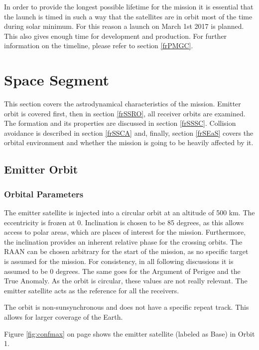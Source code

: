 In order to provide the longest possible lifetime for the mission it is essential that the launch is timed in such a way that the satellites are in orbit most of the time during solar minimum. For this reason a launch on March 1st 2017 is planned. This also gives enough time for development and production. For further information on the timeline, please refer to section \ref{frPMGC}.

\section{Space Segment}
\label{frSS}

This section covers the astrodynamical characteristics of the mission. Emitter orbit is covered first, then in section \ref{frSSRO}, all receiver orbits are examined. The formation and its properties are discussed in section \ref{frSSSC}. Collision avoidance is described in section \ref{frSSCA} and, finally, section \ref{frSEaS} covers the orbital environment and whether the mission is going to be heavily affected by it. 

\subsection{Emitter Orbit}
\label{frSSEOD}

\subsubsection{Orbital Parameters}
\label{frSSEODOP}

The emitter satellite is injected into a circular orbit at an altitude of 500 km. The eccentricity is frozen at 0. Inclination is chosen to be 85 degrees, as this allows access to polar areas, which are places of interest for the mission. Furthermore, the inclination provides an inherent relative phase for the crossing orbits. The \acl{RAAN} can be chosen arbitrary for the start of the mission, as no specific target is assumed for the mission. For consistency, in all following discussions it is assumed to be 0 degrees. The same goes for the Argument of Perigee and the True Anomaly. As the orbit is circular, these values are not really relevant. The emitter satellite acts as the reference for all the receivers.

The orbit is non-sunsynchronous and does not have a specific repeat track. This allows for larger coverage of the Earth. 

Figure \ref{fig:confmax} on page \pageref{fig:confmax} shows the emitter satellite (labeled as Base) in Orbit 1.

